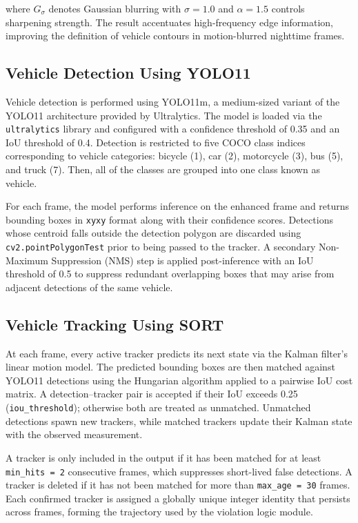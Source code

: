 \noindent where $G_\sigma$ denotes Gaussian blurring with $\sigma = 1.0$ and $\alpha = 1.5$ controls sharpening strength. The result accentuates high-frequency edge information, improving the definition of vehicle contours in motion-blurred nighttime frames.
\figUnsharp

\subsection{Vehicle Detection Using YOLO11}
Vehicle detection is performed using YOLO11m, a medium-sized variant of the YOLO11 architecture provided by Ultralytics. The model is loaded via the \texttt{ultralytics} library and configured with a confidence threshold of 0.35 and an IoU threshold of 0.4. Detection is restricted to five COCO class indices corresponding to vehicle categories: bicycle (1), car (2), motorcycle (3), bus (5), and truck (7). Then, all of the classes are grouped into one class known as vehicle.

For each frame, the model performs inference on the enhanced frame and returns bounding boxes in \texttt{xyxy} format along with their confidence scores. Detections whose centroid falls outside the detection polygon are discarded using \texttt{cv2.pointPolygonTest} prior to being passed to the tracker. A secondary Non-Maximum Suppression (NMS) step is applied post-inference with an IoU threshold of 0.5 to suppress redundant overlapping boxes that may arise from adjacent detections of the same vehicle.

\subsection{Vehicle Tracking Using SORT}
At each frame, every active tracker predicts its next state via the Kalman filter's linear motion model. The predicted bounding boxes are then matched against YOLO11 detections using the Hungarian algorithm applied to a pairwise IoU cost matrix. A detection–tracker pair is accepted if their IoU exceeds 0.25 (\texttt{iou\_threshold}); otherwise both are treated as unmatched. Unmatched detections spawn new trackers, while matched trackers update their Kalman state with the observed measurement.

A tracker is only included in the output if it has been matched for at least \texttt{min\_hits = 2} consecutive frames, which suppresses short-lived false detections. A tracker is deleted if it has not been matched for more than \texttt{max\_age = 30} frames. Each confirmed tracker is assigned a globally unique integer identity that persists across frames, forming the trajectory used by the violation logic module.


